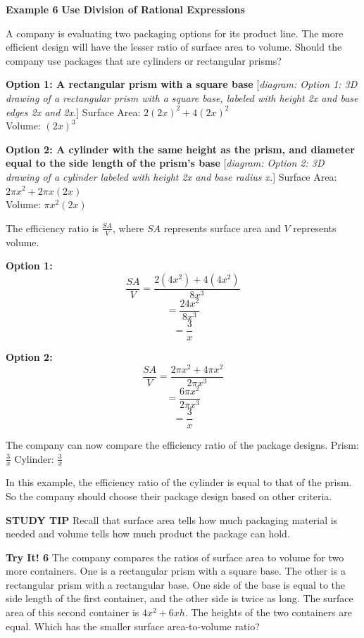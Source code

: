 \documentclass{article}
\newenvironment{example}[1]{\textbf{Example #1}}{\vspace{1em}}
\newenvironment{tryit}[1]{\textbf{Try It! #1}}{\vspace{1em}}
\newcommand{\answer}[1]{}
\newcommand{\placeholder}[2]{[\textit{#1: #2}]}
\begin{document}
\begin{example}{6}
\textbf{Use Division of Rational Expressions}

A company is evaluating two packaging options for its product line. The more efficient design will have the lesser ratio of surface area to volume. Should the company use packages that are cylinders or rectangular prisms?

\textbf{Option 1: A rectangular prism with a square base}
\placeholder{diagram}{Option 1: 3D drawing of a rectangular prism with a square base, labeled with height 2x and base edges 2x and 2x.}
Surface Area: $2(2x)^2 + 4(2x)^2$ \\
Volume: $(2x)^3$

\textbf{Option 2: A cylinder with the same height as the prism, and diameter equal to the side length of the prism's base}
\placeholder{diagram}{Option 2: 3D drawing of a cylinder labeled with height 2x and base radius x.}
Surface Area: $2\pi x^2 + 2\pi x(2x)$ \\
Volume: $\pi x^2(2x)$

The efficiency ratio is $\frac{SA}{V}$, where $SA$ represents surface area and $V$ represents volume.

\textbf{Option 1:}
$$ \frac{SA}{V} = \frac{2(4x^2) + 4(4x^2)}{8x^3} $$
$$ = \frac{24x^2}{8x^3} $$
$$ = \frac{3}{x} $$

\textbf{Option 2:}
$$ \frac{SA}{V} = \frac{2\pi x^2 + 4\pi x^2}{2\pi x^3} $$
$$ = \frac{6\pi x^2}{2\pi x^3} $$
$$ = \frac{3}{x} $$

The company can now compare the efficiency ratio of the package designs.
Prism: $\frac{3}{x}$ \qquad Cylinder: $\frac{3}{x}$

In this example, the efficiency ratio of the cylinder is equal to that of the prism. So the company should choose their package design based on other criteria.

\textbf{STUDY TIP}
Recall that surface area tells how much packaging material is needed and volume tells how much product the package can hold.
\end{example}

\begin{tryit}{6}
The company compares the ratios of surface area to volume for two more containers. One is a rectangular prism with a square base. The other is a rectangular prism with a rectangular base. One side of the base is equal to the side length of the first container, and the other side is twice as long. The surface area of this second container is $4x^2 + 6xh$. The heights of the two containers are equal. Which has the smaller surface area-to-volume ratio?
\answer{}
\end{tryit}
\end{document}
